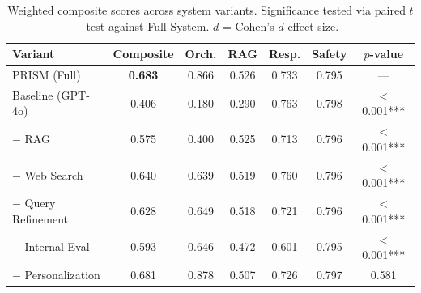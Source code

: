 \begin{table}[htbp]
\centering
\caption{Weighted composite scores across system variants. Significance tested via paired $t$-test against Full System. $d$ = Cohen's $d$ effect size.}
\label{tab:composite}
\begin{tabular}{lcccccc}
\toprule
Variant & Composite & Orch. & RAG & Resp. & Safety & $p$-value \\
\midrule
PRISM (Full) & \textbf{0.683} & 0.866 & 0.526 & 0.733 & 0.795 & --- \\
Baseline (GPT-4o) & 0.406 & 0.180 & 0.290 & 0.763 & 0.798 & $<$0.001*** \\
$-$ RAG & 0.575 & 0.400 & 0.525 & 0.713 & 0.796 & $<$0.001*** \\
$-$ Web Search & 0.640 & 0.639 & 0.519 & 0.760 & 0.796 & $<$0.001*** \\
$-$ Query Refinement & 0.628 & 0.649 & 0.518 & 0.721 & 0.796 & $<$0.001*** \\
$-$ Internal Eval & 0.593 & 0.646 & 0.472 & 0.601 & 0.795 & $<$0.001*** \\
$-$ Personalization & 0.681 & 0.878 & 0.507 & 0.726 & 0.797 & 0.581 \\
\bottomrule
\end{tabular}
\end{table}
